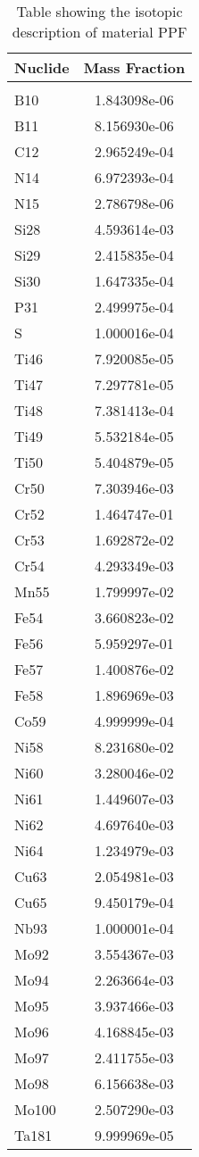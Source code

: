 \begin{centering}
\begin{table}[ht!]
\begin{tabular}{l | c}
\hline
Nuclide & Mass Fraction\\
\hline
\\
B10 & 1.843098e-06\\
B11 & 8.156930e-06\\
C12 & 2.965249e-04\\
N14 & 6.972393e-04\\
N15 & 2.786798e-06\\
Si28 & 4.593614e-03\\
Si29 & 2.415835e-04\\
Si30 & 1.647335e-04\\
P31 & 2.499975e-04\\
S & 1.000016e-04\\
Ti46 & 7.920085e-05\\
Ti47 & 7.297781e-05\\
Ti48 & 7.381413e-04\\
Ti49 & 5.532184e-05\\
Ti50 & 5.404879e-05\\
Cr50 & 7.303946e-03\\
Cr52 & 1.464747e-01\\
Cr53 & 1.692872e-02\\
Cr54 & 4.293349e-03\\
Mn55 & 1.799997e-02\\
Fe54 & 3.660823e-02\\
Fe56 & 5.959297e-01\\
Fe57 & 1.400876e-02\\
Fe58 & 1.896969e-03\\
Co59 & 4.999999e-04\\
Ni58 & 8.231680e-02\\
Ni60 & 3.280046e-02\\
Ni61 & 1.449607e-03\\
Ni62 & 4.697640e-03\\
Ni64 & 1.234979e-03\\
Cu63 & 2.054981e-03\\
Cu65 & 9.450179e-04\\
Nb93 & 1.000001e-04\\
Mo92 & 3.554367e-03\\
Mo94 & 2.263664e-03\\
Mo95 & 3.937466e-03\\
Mo96 & 4.168845e-03\\
Mo97 & 2.411755e-03\\
Mo98 & 6.156638e-03\\
Mo100 & 2.507290e-03\\
Ta181 & 9.999969e-05
\end{tabular}
\caption{Table showing the isotopic description of material PPF}
\label{table:material_PPF}
\end{table}\clearpage


\end{centering}
